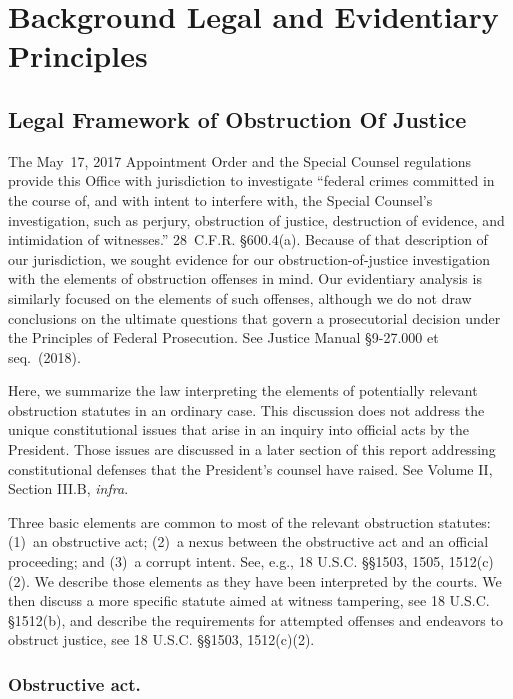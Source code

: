 \section{Background Legal and Evidentiary Principles}

\subsection{Legal Framework of Obstruction Of Justice}

The May~17, 2017 Appointment Order and the Special Counsel regulations provide this Office with jurisdiction to investigate “federal crimes committed in the course of, and with intent to interfere with, the Special Counsel's investigation, such as perjury, obstruction of justice, destruction of evidence, and intimidation of witnesses.”
28~C.F.R. \S 600.4(a).
Because of that description of our jurisdiction, we sought evidence for our obstruction-of-justice investigation with the elements of obstruction offenses in mind.
Our evidentiary analysis is similarly focused on the elements of such offenses, although we do not draw conclusions on the ultimate questions that govern a prosecutorial decision under the Principles of Federal Prosecution.
See Justice Manual \S 9-27.000 et seq.~(2018).

Here, we summarize the law interpreting the elements of potentially relevant obstruction statutes in an ordinary case.
This discussion does not address the unique constitutional issues that arise in an inquiry into official acts by the President.
Those issues are discussed in a later section of this report addressing constitutional defenses that the President’s counsel have raised. See Volume II, Section III.B, \textit{infra}.

Three basic elements are common to most of the relevant obstruction statutes: (1)~an obstructive act; (2)~a nexus between the obstructive act and an official proceeding; and (3)~a corrupt intent.
See, e.g., 18 U.S.C. \S\S 1503, 1505, 1512(c)(2).
We describe those elements as they have been interpreted by the courts.
We then discuss a more specific statute aimed at witness tampering, see 18 U.S.C. \S 1512(b), and describe the requirements for attempted offenses and endeavors to obstruct justice, see 18 U.S.C. \S\S 1503, 1512(c)(2).

\subsubsection*{Obstructive act.}

